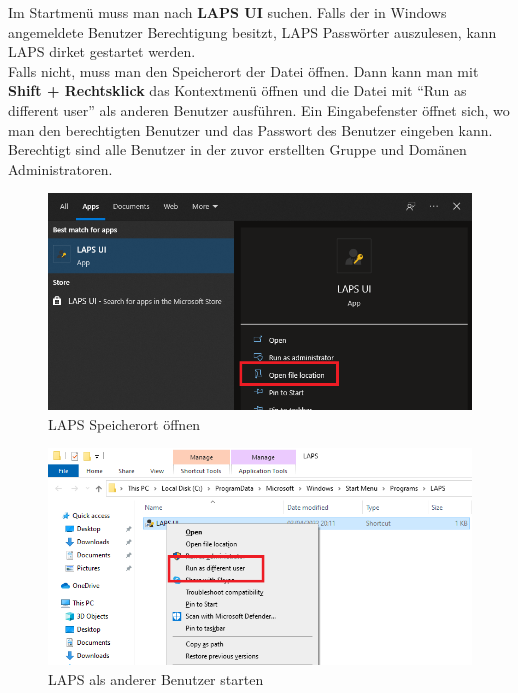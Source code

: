 Im Startmenü muss man nach \textbf{LAPS UI} suchen. Falls der in Windows angemeldete Benutzer Berechtigung besitzt, LAPS Passwörter auszulesen, kann LAPS dirket gestartet werden.\\
Falls nicht, muss man den Speicherort der Datei öffnen.
Dann kann man mit \textbf{Shift + Rechtsklick} das Kontextmenü öffnen und die Datei mit ``Run as different user'' als anderen Benutzer ausführen.
Ein Eingabefenster öffnet sich, wo man den berechtigten Benutzer und das Passwort des Benutzer eingeben kann.
Berechtigt sind alle Benutzer in der zuvor erstellten Gruppe und Domänen Administratoren.\\
\begin{minipage}{0.5\linewidth}
    \begin{figure}[H]
        \centering
        \includegraphics[width=\linewidth]{../img/LAPS/usage-1.png}
        \caption{LAPS Speicherort öffnen}
    \end{figure}
\end{minipage}
\begin{minipage}{0.5\linewidth}
    \begin{figure}[H]
        \centering
        \includegraphics[width=\linewidth]{../img/LAPS/usage-2.png}
        \caption{LAPS als anderer Benutzer starten}
    \end{figure}
\end{minipage}\\

